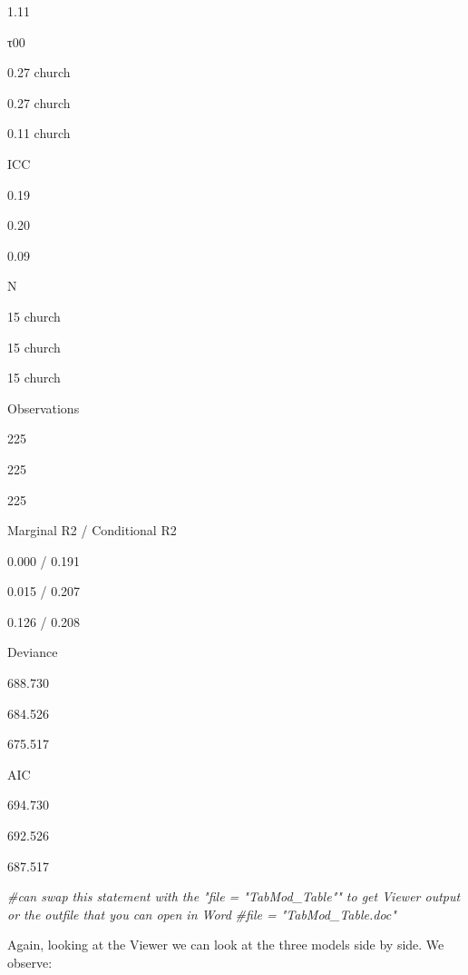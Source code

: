 \documentclass[
  11pt,
]{book}
\newenvironment{Shaded}{\begin{snugshade}}{\end{snugshade}}
\newcommand{\CommentTok}[1]{\textcolor[rgb]{0.56,0.35,0.01}{\textit{#1}}}
\begin{document}
1.11

τ00

0.27 church

0.27 church

0.11 church

ICC

0.19

0.20

0.09

N

15 church

15 church

15 church

Observations

225

225

225

Marginal R2 / Conditional R2

0.000 / 0.191

0.015 / 0.207

0.126 / 0.208

Deviance

688.730

684.526

675.517

AIC

694.730

692.526

687.517

\begin{Shaded}
\begin{Highlighting}[]
\CommentTok{\#can swap this statement with the "file = "TabMod\_Table"" to get Viewer output or the outfile that you can open in Word}
\CommentTok{\#file = "TabMod\_Table.doc"}
\end{Highlighting}
\end{Shaded}

Again, looking at the Viewer we can look at the three models side by side. We observe:
\end{document}
